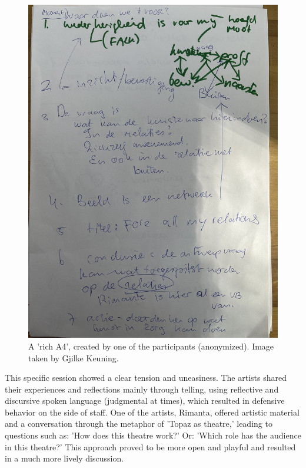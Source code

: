 \documentclass[authordate, empirical]{jote-new-article}
\begin{document}
	\begin{figure}
		\includegraphics[width=\linewidth]{media/fig+1.jpeg}

		\caption{A 'rich A4', created by one of the participants (anonymized). Image taken by Gjilke Keuning.}



	\end{figure}













	This specific session showed a clear tension and uneasiness. The artists shared their experiences and reflections mainly through telling, using reflective and discursive spoken language (judgmental at times), which resulted in defensive behavior on the side of staff. One of the artists, Rimanta, offered artistic material and a conversation through the metaphor of 'Topaz as theatre,' leading to questions such as: 'How does this theatre work?' Or: 'Which role has the audience in this theatre?' This approach proved to be more open and playful and resulted in a much more lively discussion.
\end{document}
